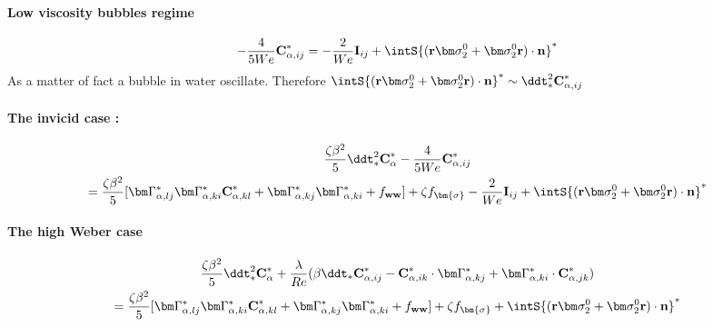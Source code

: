 \paragraph*{Low viscosity bubbles regime }
\begin{equation}    
    - \frac{4  }{5 We} \textbf{C}_{\alpha,ij}^*\\
    =  
    - \frac{2 }{We} \textbf{I}_{ij} 
    +  \intS{(\textbf{r}\bm\sigma_2^0+ \bm\sigma_2^0\textbf{r})\cdot \textbf{n}}^*
\end{equation}
As a matter of fact a bubble in water oscillate. 
Therefore $\intS{(\textbf{r}\bm\sigma_2^0+ \bm\sigma_2^0\textbf{r})\cdot \textbf{n}}^*\sim \ddt^2_* \textbf{C}^*_{\alpha,ij}$

\paragraph*{The invicid case : }
\begin{multline}    
    \frac{\zeta \beta^2}{5}\ddt^2_* \textbf{C}_\alpha^*
    - \frac{4  }{5 We} \textbf{C}_{\alpha,ij}^*\\
    =  \frac{\zeta \beta^2}{5}[
        \bm\Gamma_{\alpha,lj}^* \bm\Gamma_{\alpha,ki}^* \textbf{C}_{\alpha,kl}^* 
        + 
        \bm\Gamma_{\alpha,kj}^* \bm\Gamma_{\alpha,ki}^* 
        + f_\textbf{ww}]
        +\zeta f_{\bm{\sigma}}
        - \frac{2 }{We} \textbf{I}_{ij} 
        +  \intS{(\textbf{r}\bm\sigma_2^0+ \bm\sigma_2^0\textbf{r})\cdot \textbf{n}}^*
\end{multline}

\paragraph*{The high Weber case}
\begin{multline}    
     \frac{\zeta \beta^2}{5}\ddt^2_* \textbf{C}_\alpha^*
    +   \frac{\lambda}{Re} (
        \beta\ddt_* \textbf{C}_{\alpha,ij}^*
    - 
    \textbf{C}_{\alpha,ik}^* \cdot \bm\Gamma_{\alpha,kj}^*
    +  \bm\Gamma_{\alpha,ki}^* \cdot \textbf{C}_{\alpha,jk}^*
    )\\
    =   \frac{\zeta \beta^2}{5}[
        \bm\Gamma_{\alpha,lj}^* \bm\Gamma_{\alpha,ki}^* \textbf{C}_{\alpha,kl}^* 
        + 
        \bm\Gamma_{\alpha,kj}^* \bm\Gamma_{\alpha,ki}^* 
         +f_\textbf{ww}]
        +\zeta f_{\bm{\sigma}}
        +  \intS{(\textbf{r}\bm\sigma_2^0+ \bm\sigma_2^0\textbf{r})\cdot \textbf{n}}^*
\end{multline}